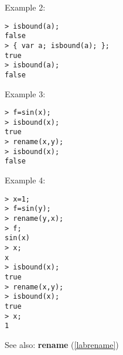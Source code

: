 \noindent Example 2: 
\begin{center}\begin{minipage}{15cm}\begin{Verbatim}[frame=single]
> isbound(a);
false
> { var a; isbound(a); };
true
> isbound(a);
false
\end{Verbatim}
\end{minipage}\end{center}
\noindent Example 3: 
\begin{center}\begin{minipage}{15cm}\begin{Verbatim}[frame=single]
> f=sin(x);
> isbound(x);
true
> rename(x,y);
> isbound(x);
false
\end{Verbatim}
\end{minipage}\end{center}
\noindent Example 4: 
\begin{center}\begin{minipage}{15cm}\begin{Verbatim}[frame=single]
> x=1;
> f=sin(y);
> rename(y,x);
> f;
sin(x)
> x;
x
> isbound(x);
true
> rename(x,y);
> isbound(x);
true
> x;
1
\end{Verbatim}
\end{minipage}\end{center}
See also: \textbf{rename} (\ref{labrename})
